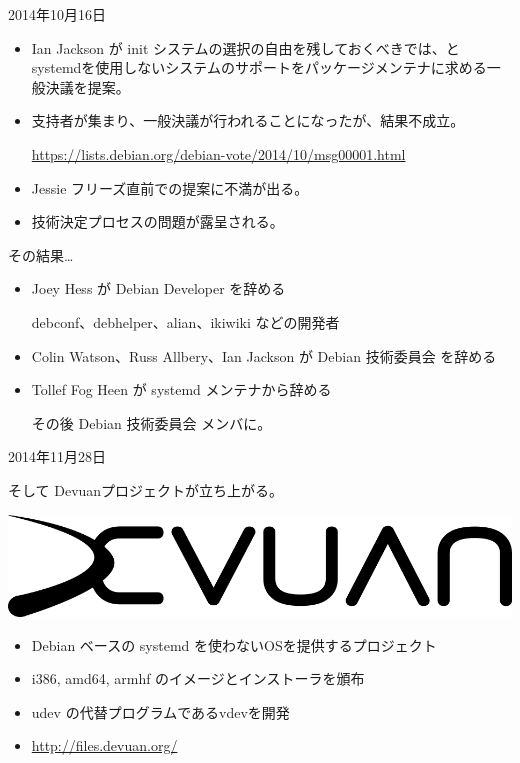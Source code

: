 \begin{frame}{2014年10月16日}

\begin{itemize}
\item Ian Jackson が init システムの選択の自由を残しておくべきでは、と
systemdを使用しないシステムのサポートをパッケージメンテナに求める一般決議を提案。
\item 支持者が集まり、一般決議が行われることになったが、結果不成立。

\url{https://lists.debian.org/debian-vote/2014/10/msg00001.html}

\item Jessie フリーズ直前での提案に不満が出る。
\item 技術決定プロセスの問題が露呈される。

\end{itemize}

\end{frame}

\begin{frame}{その結果…}


\begin{itemize}
\item Joey Hess が Debian Developer を辞める

debconf、debhelper、alian、ikiwiki などの開発者

\item Colin Watson、Russ Allbery、Ian Jackson が Debian 技術委員会 を辞める
\item Tollef Fog Heen が systemd メンテナから辞める

その後 Debian 技術委員会 メンバに。

\end{itemize}

\end{frame}

\begin{frame}{2014年11月28日}

そして Devuanプロジェクトが立ち上がる。

\begin{center}
\includegraphics[width=1\hsize]{image201510/Devuan-logo.png}
\end{center}

\begin{itemize}
\item Debian ベースの systemd を使わないOSを提供するプロジェクト
\item i386, amd64, armhf のイメージとインストーラを頒布
\item udev の代替プログラムであるvdevを開発
\item \url{http://files.devuan.org/}
\end{itemize}

\end{frame}

